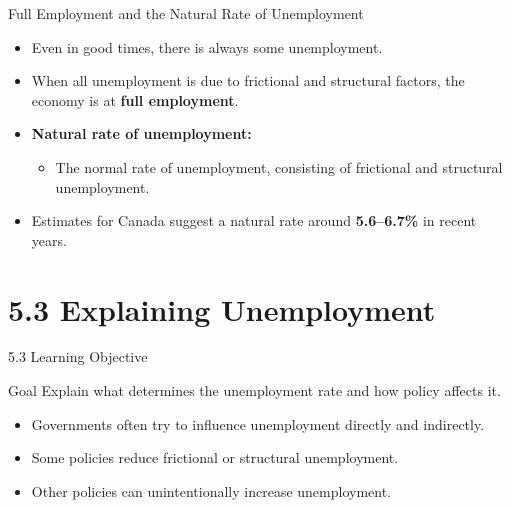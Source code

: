 \documentclass[aspectratio=169]{beamer}
\begin{document}
\begin{frame}{Full Employment and the Natural Rate of Unemployment}
\transfade
\begin{itemize}[<+->]
  \item Even in good times, there is always some unemployment.
  \item When all unemployment is due to frictional and structural factors, the economy is at \textbf{full employment}.
  \item \textbf{Natural rate of unemployment:}
  \begin{itemize}[<+->]
    \item The normal rate of unemployment, consisting of frictional and structural unemployment.
  \end{itemize}
  \item Estimates for Canada suggest a natural rate around \textbf{5.6--6.7\%} in recent years.
\end{itemize}
\end{frame}

\section{5.3 Explaining Unemployment}

\begin{frame}{5.3 Learning Objective}
\transfade
\begin{block}{Goal}
Explain what determines the unemployment rate and how policy affects it.
\end{block}
\begin{itemize}[<+->]
  \item Governments often try to influence unemployment directly and indirectly.
  \item Some policies \alert{reduce} frictional or structural unemployment.
  \item Other policies can unintentionally \alert{increase} unemployment.
\end{itemize}
\end{frame}
\end{document}
